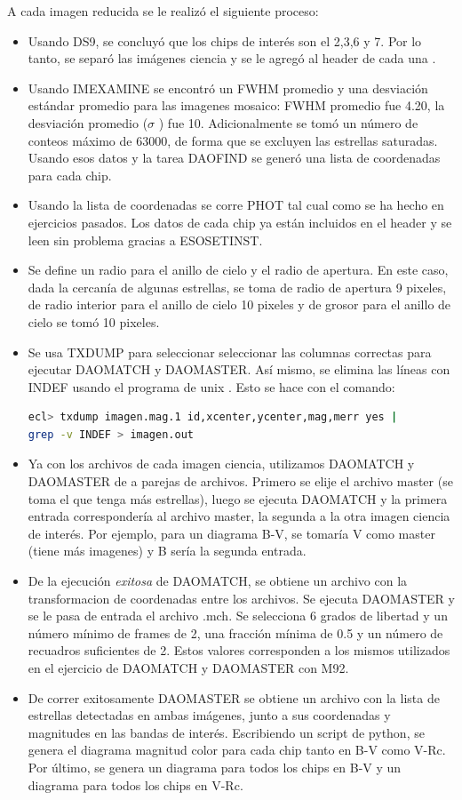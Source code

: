 \documentclass[12pt]{article}
\begin{document}
A cada imagen reducida se le realizó el siguiente proceso:
\begin{itemize}
\item Usando DS9, se concluyó que los chips de interés son el 2,3,6 y 7. Por lo tanto, se separó las imágenes ciencia y se le agregó al header de cada una .
\item Usando IMEXAMINE se encontró un FWHM promedio y una desviación estándar promedio para las imagenes mosaico: FWHM promedio fue 4.20, la desviación promedio ($\sigma$ ) fue 10. Adicionalmente se tomó un número de conteos máximo de 63000, de forma que se excluyen las estrellas saturadas. Usando esos datos y la tarea DAOFIND se generó una lista de coordenadas para cada chip.
\item Usando la lista de coordenadas se corre PHOT tal cual como se ha hecho en ejercicios pasados. Los datos de cada chip ya están incluidos en el header y se leen sin problema gracias a ESOSETINST. 
\item Se define un radio para el anillo de cielo y el radio de apertura. En este caso, dada la cercanía de algunas estrellas, se toma de radio de apertura 9 pixeles, de radio interior para el anillo de cielo 10 pixeles y de grosor para el anillo de cielo se tomó 10 pixeles.
\item Se usa TXDUMP para seleccionar seleccionar las columnas correctas para ejecutar DAOMATCH y DAOMASTER. Así mismo, se elimina las líneas con INDEF usando el programa de unix . Esto se hace con el comando:
\begin{lstlisting}[language=bash]
ecl> txdump imagen.mag.1 id,xcenter,ycenter,mag,merr yes |
grep -v INDEF > imagen.out
\end{lstlisting}
\item Ya con los archivos  de cada imagen ciencia, utilizamos DAOMATCH y DAOMASTER de a parejas de archivos. Primero se elije el archivo master (se toma el que tenga más estrellas), luego se ejecuta DAOMATCH y la primera entrada correspondería al archivo master, la segunda a la otra imagen ciencia de interés. Por ejemplo, para un diagrama B-V, se tomaría V como master (tiene más imagenes) y B sería la segunda entrada. 
\item De la ejecución \emph{exitosa} de DAOMATCH, se obtiene un archivo  con la transformacion de coordenadas entre los archivos. Se ejecuta DAOMASTER y se le pasa de entrada el archivo .mch. Se selecciona 6 grados de libertad y un número mínimo de frames de 2, una fracción mínima de 0.5 y un número de recuadros suficientes de 2. Estos valores corresponden a los mismos utilizados en el ejercicio de DAOMATCH y DAOMASTER con M92.
\item De correr exitosamente DAOMASTER se obtiene un archivo  con la lista de estrellas detectadas en ambas imágenes, junto a sus coordenadas y magnitudes en las bandas de interés. Escribiendo un script de python, se genera el diagrama magnitud color para cada chip tanto en B-V como V-Rc. Por último, se genera un diagrama para todos los chips en B-V y un diagrama para todos los chips en V-Rc.
\end{itemize}
\end{document}
